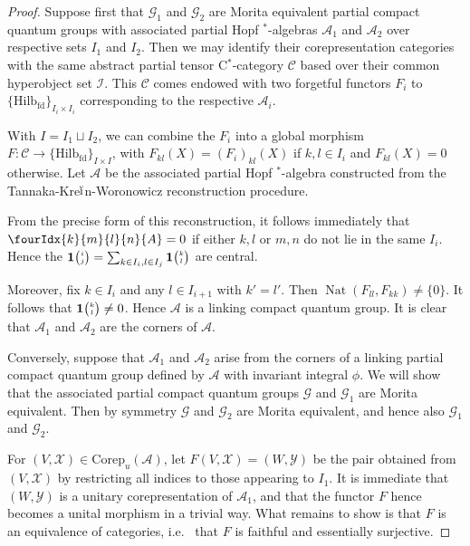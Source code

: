 \documentclass[10pt]{article}
\DeclareMathOperator{\fin}{\mathrm{fd}}
\DeclareMathOperator{\Nat}{\mathrm{Nat}}
\newcommand{\Corep}{\mathrm{Corep}}
\newcommand{\CatCC}{\mathscr{C}}
\newcommand{\Hilb}{\mathrm{Hilb}}
\newcommand{\Grt}[3]{#1{\tiny {\begin{pmatrix} #2\\#3\end{pmatrix}}}}
\newcommand{\UnitC}[2]{\Grt{\mathbf{1}}{#1}{#2}}
\newcommand{\Gr}[5]{\fourIdx{#2}{#4}{#3}{#5}{#1}}%
\theoremstyle{definition}
\numberwithin{equation}{section}
\begin{document}
\begin{proof} Suppose first that $\mathscr{G}_1$ and $\mathscr{G}_2$ are Morita equivalent partial compact quantum groups with associated partial Hopf $^*$-algebras $\mathscr{A}_1$ and $\mathscr{A}_2$ over respective sets $I_1$ and $I_2$. Then we may identify their corepresentation categories with the same abstract partial tensor C$^*$-category $\CatCC$ based over their common hyperobject set $\mathscr{I}$. This $\CatCC$ comes endowed with two forgetful functors $F_i$ to $\{\Hilb_{\fin}\}_{I_i\times I_i}$ corresponding to the respective $\mathscr{A}_i$.

With $I = I_1\sqcup I_2$, we can combine the $F_i$ into a global morphism $F:\CatCC \rightarrow \{\Hilb_{\fin}\}_{I\times I}$, with $F_{kl}(X)=(F_i)_{kl}(X)$ if $k,l\in I_i$ and $F_{kl}(X)=0$ otherwise. Let $\mathscr{A}$ be the associated partial Hopf $^*$-algebra constructed from the Tannaka-Kre$\breve{\textrm{\i}}$n-Woronowicz reconstruction procedure. 

From the precise form of this reconstruction, it follows immediately that $\Gr{A}{k}{l}{m}{n} =0$ if either $k,l$ or $m,n$ do not lie in the same $I_i$. Hence the $\UnitC{i}{j} = \sum_{k\in I_i,l\in I_j} \UnitC{k}{l}$ are central. 

Moreover, fix $k\in I_i$ and any $l\in I_{i+1}$ with $k'=l'$. Then $\Nat(F_{ll},F_{kk})\neq \{0\}$. It follows that $\UnitC{k}{l}\neq 0$. Hence $\mathscr{A}$ is a linking compact quantum group. It is clear that $\mathscr{A}_1$ and $\mathscr{A}_2$ are the corners of $\mathscr{A}$. 

Conversely, suppose that $\mathscr{A}_1$ and $\mathscr{A}_2$ arise from the corners of a linking partial compact quantum group defined by $\mathscr{A}$ with invariant integral $\phi$. We will show that the associated partial compact quantum groups $\mathscr{G}$ and $\mathscr{G}_1$ are Morita equivalent. Then by symmetry $\mathscr{G}$ and $\mathscr{G}_2$ are Morita equivalent, and hence also $\mathscr{G}_1$ and $\mathscr{G}_2$.

For $(V,\mathscr{X}) \in \Corep_u(\mathscr{A})$, let $F(V,\mathscr{X}) = (W,\mathscr{Y})$ be the pair obtained from $(V,\mathscr{X})$ by restricting all indices to those appearing to $I_1$. It is immediate that $(W,\mathscr{Y})$ is a unitary corepresentation of $\mathscr{A}_1$, and that the functor $F$ hence becomes a unital morphism in a trivial way. What remains to show is that $F$ is an equivalence of categories, i.e.~ that $F$ is faithful and essentially surjective. 


\end{proof}
\end{document}

